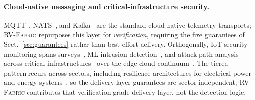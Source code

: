 \documentclass[runningheads]{llncs}
\newcommand{\sys}{\textsc{RV-Fabric}\xspace}
\begin{document}
\paragraph{Cloud-native messaging and critical-infrastructure security.}
MQTT~\cite{mqtt,mosquitto}, NATS~\cite{nats}, and Kafka~\cite{kafka} are the standard
cloud-native telemetry transports; \sys repurposes this layer for \emph{verification},
requiring the five guarantees of Sect.~\ref{sec:guarantees} rather than best-effort
delivery. Orthogonally, IoT security monitoring spans surveys~\cite{cavalli2024iotsec}, ML
intrusion detection~\cite{santhoshkumar2023mliot}, and attack-path analysis across
critical infrastructures~\cite{stellios2018iot} over the edge-cloud
continuum~\cite{shi2016edge}. The tiered pattern recurs across sectors, including resilience
architectures for electrical power and energy systems~\cite{resilagent2026}, so the
delivery-layer guarantees are sector-independent; \sys contributes that
verification-grade delivery layer, not the detection logic.

\end{document}
